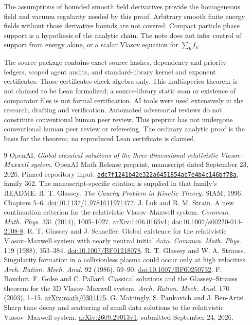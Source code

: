 \documentclass[11pt]{article}
\theoremstyle{remark}\newtheorem{remark}[theorem]{Remark}
\numberwithin{equation}{section}
\begin{document}
The assumptions of bounded smooth field derivatives provide the homogeneous
field and vacuum regularity needed by this proof. Arbitrary smooth finite
energy fields without those derivative bounds are not covered. Compact
particle phase support is a hypothesis of the analytic chain. The note
does not infer control of support from energy alone, or a scalar Vlasov
equation for $\sum_b f_b$.

The source package contains exact source hashes, dependency and priority
ledgers, scoped agent audits, and standard-library kernel and exponent
certificates. Those certificates check algebra only. This multispecies
theorem is not claimed to be Lean formalized; a source-library static scan
or existence of comparator files is not formal certification.
AI tools were used extensively in the research, drafting and verification.
Automated adversarial reviews do not constitute conventional human peer
review. This preprint has not undergone conventional human peer review or
refereeing. The ordinary analytic proof is the basis for the theorem; no
reproduced Lean certificate is claimed.

\begingroup\small\raggedright
\begin{thebibliography}{9}
\setlength{\itemsep}{3pt}
 OpenAI.
\emph{Global classical solutions of the three-dimensional relativistic
Vlasov--Maxwell system}. OpenAI Math Release preprint, manuscript dated
September 23, 2026. Pinned repository input:
\href{https://github.com/openai/math/tree/adc7f1241b42e322a6451854ab7e4b4c146bf78a}{\texttt{adc7f1241b42e322a6451854ab7e4b4c146bf78a}}, family 362.
The manuscript-specific citation is supplied in that family's README.
 R. T. Glassey. \emph{The Cauchy Problem in Kinetic Theory}.
SIAM, 1996, Chapters 5--6. \href{https://doi.org/10.1137/1.9781611971477}{doi:10.1137/1.9781611971477}.
 J. Luk and R. M. Strain.
A new continuation criterion for the relativistic Vlasov--Maxwell system.
\emph{Commun. Math. Phys.} 331 (2014), 1005--1027.
\href{https://arxiv.org/abs/1406.0165v1}{arXiv:1406.0165v1};
\href{https://doi.org/10.1007/s00220-014-2108-8}{doi:10.1007/s00220-014-2108-8}.
 R. T. Glassey and J. Schaeffer.
Global existence for the relativistic Vlasov--Maxwell system with nearly
neutral initial data. \emph{Commun. Math. Phys.} 119 (1988), 353--384.
\href{https://doi.org/10.1007/BF01218078}{doi:10.1007/BF01218078}.
 R. T. Glassey and W. A. Strauss.
Singularity formation in a collisionless plasma could occur only at high
velocities. \emph{Arch. Ration. Mech. Anal.} 92 (1986), 59--90.
\href{https://doi.org/10.1007/BF00250732}{doi:10.1007/BF00250732}.
 F. Bouchut, F. Golse and C. Pallard.
Classical solutions and the Glassey--Strauss theorem for the 3D
Vlasov--Maxwell system. \emph{Arch. Ration. Mech. Anal.} 170 (2003), 1--15.
\href{https://arxiv.org/abs/math/0301175}{arXiv:math/0301175}.
 G. Mattingly, S. Pankavich and J. Ben-Artzi.
Sharp time decay and scattering of small data solutions to the relativistic
Vlasov--Maxwell system. \href{https://arxiv.org/abs/2609.29013v1}{arXiv:2609.29013v1},
submitted September 24, 2026.
\end{thebibliography}
\endgroup
\end{document}

